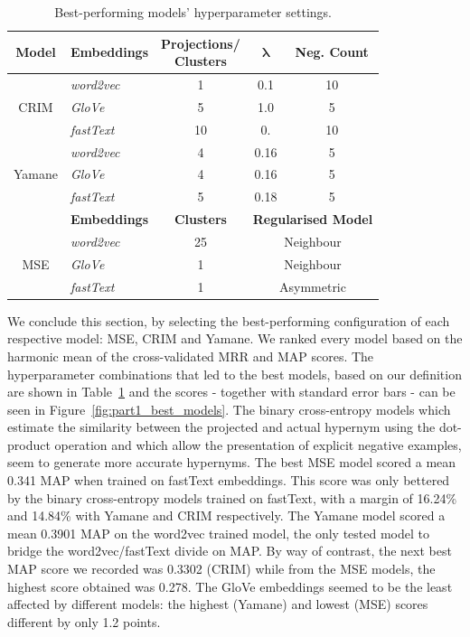 \begin{table}\centering
    \begin{tabular}{@{}clccc@{}} \toprule
    \textbf{Model} & \textbf{Embeddings} & \shortstack{\textbf{Projections/}\\\textbf{Clusters}} & $\bm{\lambda}$ & \textbf{Neg. Count} \\ \midrule
    \multirow{3}{*}{CRIM} & \textit{word2vec} & 1 & 0.1 & 10 \\
    & \textit{GloVe} & 5 & 1.0 & 5\\
    & \textit{fastText} & 10 & 0. & 10\\ \cmidrule{2-5}
    \multirow{3}{*}{Yamane} & \textit{word2vec} & 4 & 0.16 & 5 \\
    & \textit{GloVe} & 4 & 0.16 & 5\\
    & \textit{fastText} & 5 & 0.18 & 5\\ \midrule
    & \textbf{Embeddings} & \textbf{Clusters} & \multicolumn{2}{c}{\textbf{Regularised Model}}\\ \cmidrule{2-5}
    \multirow{3}{*}{MSE} & \textit{word2vec} & 25 & \multicolumn{2}{c}{Neighbour} \\
    & \textit{GloVe} & 1 & \multicolumn{2}{c}{Neighbour} \\
    & \textit{fastText} & 1 & \multicolumn{2}{c}{Asymmetric} \\
    \bottomrule
    \end{tabular}
    \caption{Best-performing models' hyperparameter settings.}\label{tab:all_model_best_hyper}
\end{table}

We conclude this section, by selecting the best-performing configuration of each respective model: \ac{MSE}, CRIM and Yamane.  We ranked every model based on the harmonic mean of the cross-validated \ac{MRR} and \ac{MAP} scores.  The hyperparameter combinations that led to the best models, based on our definition are shown in Table~\ref{tab:all_model_best_hyper} and the scores - together with standard error bars - can be seen in Figure~\ref{fig:part1_best_models}.  The binary cross-entropy models which estimate the similarity between the projected and actual hypernym using the dot-product operation and which allow the presentation of explicit negative examples, seem to generate more accurate hypernyms.  The best \ac{MSE} model scored a mean 0.341 \ac{MAP} when trained on fastText embeddings.  This score was only bettered by the binary cross-entropy models trained on fastText, with a margin of 16.24\% and 14.84\% with Yamane and CRIM respectively.  The Yamane model scored a mean 0.3901 \ac{MAP} on the word2vec trained model, the only tested model to bridge the word2vec/fastText divide on \ac{MAP}.  By way of contrast, the next best \ac{MAP} score we recorded was 0.3302 (CRIM) while from the \ac{MSE} models, the highest score obtained was 0.278.  The GloVe embeddings seemed to be the least affected by different models: the highest (Yamane) and lowest (MSE) scores different by only 1.2 points.

